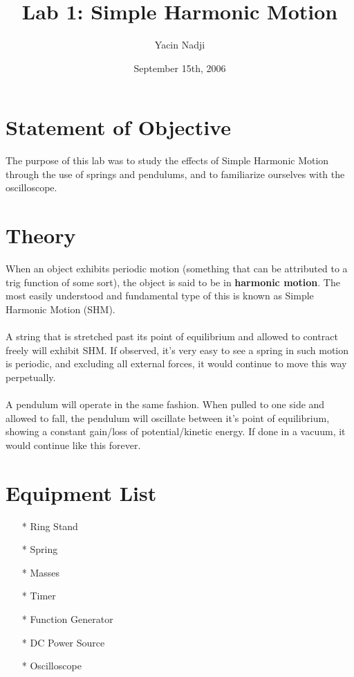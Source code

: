 \documentclass[titlepage]{article}
\title{Lab 1: Simple Harmonic Motion}
\author{Yacin Nadji}
\date{September 15th, 2006}
\begin{document}
\maketitle

\section{Statement of Objective}\label{sec:obj}
The purpose of this lab was to study the effects of Simple Harmonic Motion through the use of springs and pendulums, and to familiarize ourselves with the oscilloscope.

\section{Theory}\label{sec:theory}
When an object exhibits periodic motion (something that can be attributed to a trig function of some sort), the object is said to be in \textbf{harmonic motion}. The most easily understood and fundamental type of this is known as Simple Harmonic Motion (SHM).\\
\\
A string that is stretched past its point of equilibrium and allowed to contract freely will exhibit SHM. If observed, it's very easy to see a spring in such motion is periodic, and excluding all external forces, it would continue to move this way perpetually.\\
\\
A pendulum will operate in the same fashion. When pulled to one side and allowed to fall, the pendulum will oscillate between it's point of equilibrium, showing a constant gain/loss of potential/kinetic energy. If done in a vacuum, it would continue like this forever.

\section{Equipment List}\label{sec:equipment_list}
\begin{itemize}
\item[*] Ring Stand
\item[*] Spring
\item[*] Masses
\item[*] Timer
\item[*] Function Generator
\item[*] DC Power Source
\item[*] Oscilloscope
\end{itemize}
\end{document}
